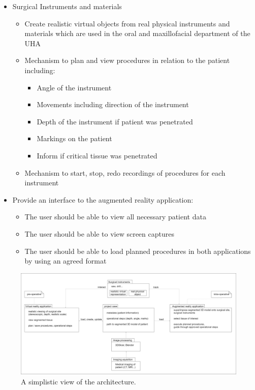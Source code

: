 \begin{itemize}
\begin{itemize}
        \end{itemize}
    \item Surgical Instruments and materials
        \begin{itemize}
            \item Create realistic virtual objects from real physical instruments and materials which are used in the oral and maxillofacial department of the UHA
            \item Mechanism to plan and view procedures in relation to the patient including:          
                \begin{itemize}
                    \item Angle of the instrument
                    \item Movements including direction of the instrument
                    \item Depth of the instrument if patient was penetrated
                    \item Markings on the patient
                    \item Inform if critical tissue was penetrated
                \end{itemize}
            \item Mechanism to start, stop, redo recordings of procedures for each instrument
        \end{itemize}
    \item Provide an interface to the augmented reality application:
        \begin{itemize}
            \item The user should be able to view all necessary patient data
            \item The user should be able to view screen captures
            \item The user should be able to load planned procedures in both applications by using an agreed format
        \end{itemize}
\end{itemize}

\begin{figure}[ht!]
    \centering
    \includegraphics[width=\linewidth]{images/project_plan.png}
    \caption{\label{fig::ProjectPlan} A simplistic view of the architecture.}
\end{figure}


